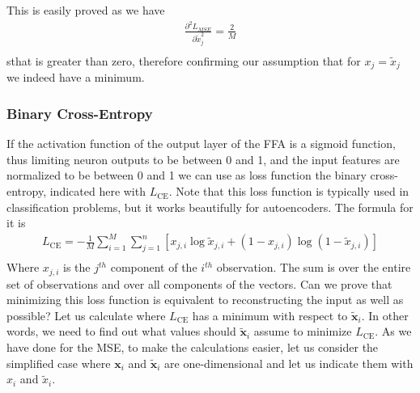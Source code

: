 \documentclass[12pt,a4]{article}
\begin{document}
This is easily proved as we have
\begin{equation}
\begin{split}
\frac{\partial^{2}L_{MSE}}{\partial\tilde{x}_{j}^{2}} =\frac{2}{M} \\ 
\end{split}
\end{equation}
sthat is greater than zero, therefore confirming our assumption that for \( x_{j} =\tilde{x}_{j}\) we indeed have a minimum.

\subsubsection{Binary Cross-Entropy}

If the activation function of the output layer of the FFA is a sigmoid function, thus limiting neuron outputs to be between 0 and 1, and the input features are normalized to be between 0 and 1 we can use as loss function the binary cross-entropy, indicated here with \( L_{\textrm{CE}}\). Note that this loss function is typically used in classification problems, but it works beautifully for autoencoders. The formula for it is
\begin{equation}
\begin{split}
L_{\textrm{CE}} = -\frac{1}{M}\sum_{i = 1}^{M}\sum_{j = 1}^{n}[x_{j,i} \log\tilde{x}_{j,i}+\left(1-x_{j,i}\right)\log (1-\tilde{x}_{j,i})] \\ 
\end{split}
\end{equation}
Where \( x_{j,i}\) is the \( j^{th}\) component of the \( i^{th}\) observation. The sum is over the entire set of observations and over all components of the vectors. Can we prove that minimizing this loss function is equivalent to reconstructing the input as well as possible? Let us calculate where \( L_{\textrm{CE}}\) has a minimum with respect to \(\tilde{\mathbf{x}}_{i}\). In other words, we need to find out what values should \(\tilde{\mathbf{x}}_{i}\) assume to minimize \( L_{\textrm{CE}}\). As we have done for the MSE, to make the calculations easier, let us consider the simplified case where \(\mathbf{x}_{i}\) and \(\tilde{\mathbf{x}}_{i}\) are one-dimensional and let us indicate them with \( x_{i}\) and \(\tilde{x}_{i}\).
\end{document}
